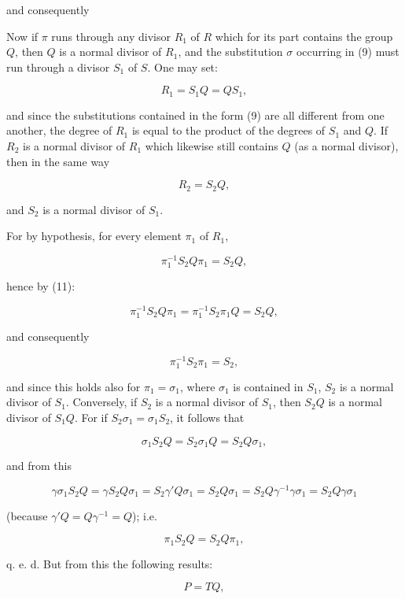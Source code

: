 and consequently


Now if $\pi$ runs through any divisor $R_1$ of $R$ which for its part contains the group $Q$, then $Q$ is a normal divisor of $R_1$, and the substitution $\sigma$ occurring in (9) must run through a divisor $S_1$ of $S$. One may set:

\[
R_1 = S_1 Q = Q S_1,
\]

and since the substitutions contained in the form (9) are all different from one another, the degree of $R_1$ is equal to the product of the degrees of $S_1$ and $Q$. If $R_2$ is a normal divisor of $R_1$ which likewise still contains $Q$ (as a normal divisor), then in the same way

\[
R_2 = S_2 Q,
\]

and $S_2$ is a normal divisor of $S_1$.

For by hypothesis, for every element $\pi_1$ of $R_1$,

\[
\pi_1^{-1}S_2 Q \pi_1 = S_2 Q,
\]

hence by (11):

\[
\pi_1^{-1}S_2 Q \pi_1 = \pi_1^{-1}S_2\pi_1 Q = S_2 Q,
\]

and consequently

\[
\pi_1^{-1}S_2\pi_1 = S_2,
\]

and since this holds also for $\pi_1 = \sigma_1$, where $\sigma_1$ is contained in $S_1$, $S_2$ is a normal divisor of $S_1$. Conversely, if $S_2$ is a normal divisor of $S_1$, then $S_2 Q$ is a normal divisor of $S_1 Q$. For if $S_2\sigma_1 = \sigma_1 S_2$, it follows that

\[
\sigma_1 S_2 Q = S_2\sigma_1 Q = S_2 Q\sigma_1,
\]

and from this

\[
\gamma\sigma_1 S_2 Q = \gamma S_2 Q\sigma_1 = S_2\gamma' Q\sigma_1 = S_2 Q\sigma_1 = S_2 Q\gamma^{-1}\gamma\sigma_1 = S_2 Q\gamma\sigma_1
\]

(because $\gamma' Q = Q\gamma^{-1} = Q$); i.e.

\[
\pi_1 S_2 Q = S_2 Q\pi_1,
\]

q. e. d. But from this the following results:


\[
P = TQ,
\]

